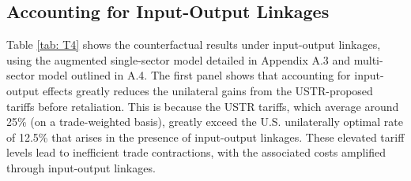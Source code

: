 \documentclass[12pt]{article}
\begin{document}

\subsection{Accounting for Input-Output Linkages}

Table \ref{tab: T4} shows the counterfactual results under input-output linkages, using the augmented single-sector model detailed in Appendix A.3 and multi-sector model outlined in A.4.
The first panel shows that accounting for input-output effects greatly reduces the unilateral gains from the USTR-proposed tariffs before retaliation. This is because the USTR tariffs, which average around 25\% (on a trade-weighted basis), greatly exceed the U.S. unilaterally optimal rate of 12.5\% that arises in the presence of input-output linkages. These elevated tariff levels lead to inefficient trade contractions, with the associated costs amplified through input-output linkages.
\end{document}
